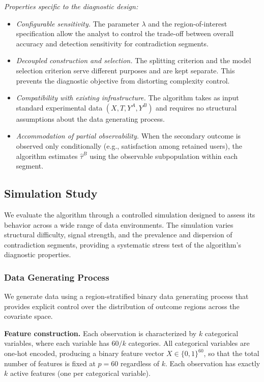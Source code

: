 \documentclass[11pt,letterpaper,english]{article}
\theoremstyle{definition}
\theoremstyle{definition}
\begin{document}
\begin{bibunit}
\vspace{4pt}
\noindent
\emph{Properties specific to the diagnostic design:}
\begin{itemize}[leftmargin=2em]
    \item \emph{Configurable sensitivity.} The parameter $\lambda$ and the region-of-interest specification allow the analyst to control the trade-off between overall accuracy and detection sensitivity for contradiction segments.
    \item \emph{Decoupled construction and selection.} The splitting criterion and the model selection criterion serve different purposes and are kept separate. This prevents the diagnostic objective from distorting complexity control.
    \item \emph{Compatibility with existing infrastructure.} The algorithm takes as input standard experimental data $(X, T, Y^A, Y^B)$ and requires no structural assumptions about the data generating process.
    \item \emph{Accommodation of partial observability.} When the secondary outcome is observed only conditionally (e.g., satisfaction among retained users), the algorithm estimates $\hat{\tau}^B$ using the observable subpopulation within each segment.
\end{itemize}


\subsection{Simulation Study}
\label{sec:simulation}

We evaluate the algorithm through a controlled simulation designed to assess its behavior across a wide range of data environments. The simulation varies structural difficulty, signal strength, and the prevalence and dispersion of contradiction segments, providing a systematic stress test of the algorithm's diagnostic properties.

\subsubsection{Data Generating Process}
\label{sec:dgp}

We generate data using a region-stratified binary data generating process that provides explicit control over the distribution of outcome regions across the covariate space.

\vspace{6pt}
\noindent
\textbf{Feature construction.}
Each observation is characterized by $k$ categorical variables, where each variable has $60/k$ categories. All categorical variables are one-hot encoded, producing a binary feature vector $X \in \{0,1\}^{60}$, so that the total number of features is fixed at $p = 60$ regardless of $k$. Each observation has exactly $k$ active features (one per categorical variable).


\end{bibunit}
\end{document}
